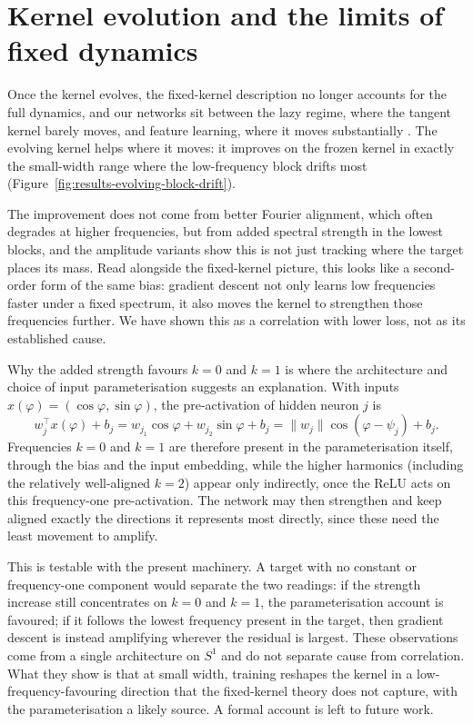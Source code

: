 \section{Kernel evolution and the limits of fixed dynamics}
\label{sec:discussion-kernel-evolution}

Once the kernel evolves, the fixed-kernel description no longer accounts for the
full dynamics, and our networks sit between the lazy regime, where the tangent
kernel barely moves, and feature learning, where it moves substantially
\citep{chizat2019lazytraining,Mei2018meanfieldview,
	chizat2018globalconvergencegradientdescent}. The evolving kernel helps where it
moves: it improves on the frozen kernel in exactly the small-width range where
the low-frequency block drifts most
(Figure~\ref{fig:results-evolving-block-drift}).

The improvement does not come from better Fourier alignment, which often degrades
at higher frequencies, but from added spectral strength in the lowest blocks, and
the amplitude variants show this is not just tracking where the target places its
mass. Read alongside the fixed-kernel picture, this looks like a second-order
form of the same bias: gradient descent not only learns low frequencies faster
under a fixed spectrum, it also moves the kernel to strengthen those frequencies
further. We have shown this as a correlation with lower loss, not as its
established cause.

Why the added strength favours \(k=0\) and \(k=1\) is where the architecture and choice of
input parameterisation suggests an explanation. With inputs \(x(\varphi)=(\cos\varphi,\sin\varphi)\),
the pre-activation of hidden neuron \(j\) is
\begin{equation}
	w_j^\top x(\varphi) + b_j
	= w_{j_1}\cos\varphi + w_{j_2}\sin\varphi + b_j
	= \|w_j\|\cos(\varphi-\psi_j) + b_j .
	\label{eq:discussion-preactivation-freq-one}
\end{equation}
Frequencies \(k=0\) and \(k=1\)
are therefore present in the parameterisation itself, through the bias and the
input embedding, while the higher harmonics (including the relatively
well-aligned \(k=2\)) appear only indirectly, once the ReLU acts on this
frequency-one pre-activation. The network may then strengthen and keep aligned
exactly the directions it represents most directly, since these need the least
movement to amplify.

This is testable with the present machinery. A target with no constant or
frequency-one component would separate the two readings: if the strength increase
still concentrates on \(k=0\) and \(k=1\), the parameterisation account is
favoured; if it follows the lowest frequency present in the target, then gradient
descent is instead amplifying wherever the residual is largest.
These observations come from a single architecture on \(S^1\) and do not
separate cause from correlation. What they show is that at small width, training
reshapes the kernel in a low-frequency-favouring direction that the fixed-kernel
theory does not capture, with the parameterisation a likely source. A formal
account is left to future work.

